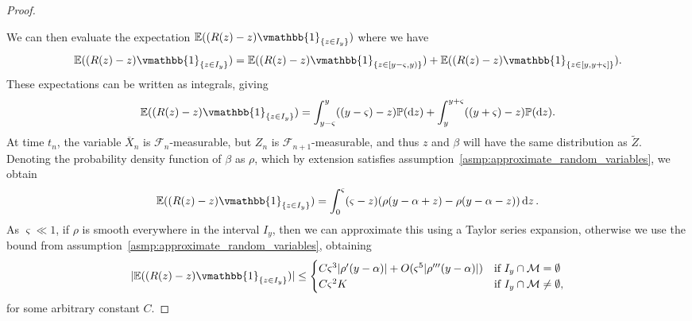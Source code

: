 \documentclass[manuscript,review]{acmart}
\newcommand{\indicatorfn}{\vmathbb{1}}
\begin{document}
\begin{proof}
\begin{figure}[htb]
\end{figure}

We can then evaluate the expectation $ \mathbb{E}((R(z) - z)\indicatorfn_{\{z \in I_y\}}) $ where we have 
\begin{equation*}
\mathbb{E}((R(z) - z)\indicatorfn_{\{z \in I_y\}}) 
= \mathbb{E}((R(z) - z)\indicatorfn_{\{z \in [y-\varsigma, y)\}}) 
+ \mathbb{E}((R(z) - z)\indicatorfn_{\{z \in [y, y+\varsigma]\}}).
\end{equation*}
These expectations can be written as integrals, giving
\begin{equation*}
\mathbb{E}((R(z) - z)\indicatorfn_{\{z \in I_y\}}) 
= \int_{y-\varsigma}^{y} ((y-\varsigma) - z) \mathbb{P}(\dd{z}) 
+ \int_{y}^{y+\varsigma} ((y+\varsigma) - z) \mathbb{P}(\dd{z}).
\end{equation*}
At time $ t_n $, the variable $ \overline{X}_n $ is $ \mathcal{F}_n $-measurable, but $ Z_n $ is $ \mathcal{F}_{n+1} $-measurable, and thus $ z $ and $ \beta $ will have the same distribution as $ \widetilde{Z} $. Denoting the probability density function of $ \beta $ as $ \rho $, which by extension satisfies assumption~\ref{asmp:approximate_random_variables}, we obtain
\begin{equation*}
\mathbb{E}((R(z) - z)\indicatorfn_{\{z \in I_y\}}) 
= \int_0^{\varsigma} (\varsigma - z) (\rho(y- \alpha + z) - \rho(y- \alpha -z)) \dd{z}.
\end{equation*}
As $ \varsigma \ll 1 $, if $ \rho $ is smooth everywhere in the interval $ I_y $, then we can approximate this using a Taylor series expansion, otherwise we use the bound from assumption~\ref{asmp:approximate_random_variables}, obtaining
\begin{equation*}
\lvert \mathbb{E}((R(z) - z)\indicatorfn_{\{z \in I_y\}}) \rvert 
\leq  \begin{cases}
C \varsigma^3 \lvert \rho'(y - \alpha)\rvert  + O(\varsigma^5 \lvert \rho'''(y-\alpha)\rvert )& \text{if } I_y \cap \mathcal{M} = \emptyset \\
C \varsigma^2 K & \text{if } I_y \cap \mathcal{M} \neq \emptyset,
\end{cases}
\end{equation*}
for some arbitrary constant $ C $.


\end{proof}
\end{document}
